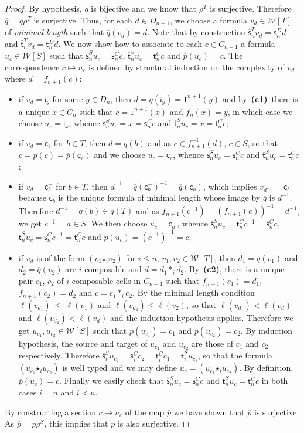 \documentclass[reqno]{amsart}
\theoremstyle{plain}
\theoremstyle{definition}
\theoremstyle{remark}
\newcommand{\source}{\mathsf{s}} %
\newcommand{\target}{\mathsf{t}} %
\newcommand{\unit}[1]{1^{#1}} %
\newcommand{\comp}[1]{\ast_{#1}} %
\newcommand{\sce}[1]{\source_{#1}} %
\newcommand{\tge}[1]{\target_{#1}} %
\newcommand{\inv}[1]{{#1}^{-1}} %
\newcommand{\WW}{\mathcal{W}}
\newcommand{\wtx}[1]{\WW[#1]} %
\newcommand{\formal}[1]{\mathsf{#1}} %
\newcommand{\fcst}[1]{\formal{c}_{#1}} %
\newcommand{\finv}[1]{\formal{c}^{\boldsymbol{-}}_{#1}}%
\newcommand{\fid}[1]{\formal{i}_{#1}} %
\newcommand{\fcomp}[1]{\bm{\star}_{#1}} %
\newcommand{\cans}[1]{\rho^{#1}} %
\newcommand{\fcls}[1]{\widetilde{#1}}%
\newcommand{\scex}[1]{\extend{\source}_{#1}}
\newcommand{\tgex}[1]{\extend{\target}_{#1}}
\newcommand{\lgh}{\ell}%
\newcommand{\extend}[1]{\overline{#1}} %
\newcommand{\cndi}{\textbf{(c1)}} %
\newcommand{\cndii}{\textbf{(c2)}} %
\begin{document}
\begin{proof}
  By hypothesis, $\fcls q$ is bijective and we know that $\cans T$ is
surjective. Therefore $\extend q=\fcls q\cans T$ is surjective.  Thus,
for each $d\in D_{n+1}$, we choose a formula  $v_d\in \wtx T$ of
{\em minimal length} such
that $\extend q(v_d)=d$. Note that by construction $\scex
n^Tv_d=\sce n^D d$ and $\tgex n^Tv_d=\tge n^D d$.
We now show how to associate to each $c\in C_{n+1}$ a formula
$u_c\in\wtx S$ such that $\scex n^S u_c=\sce
n^C c$, $\tgex n^S u_c=\tge n^C c$ and $\extend p(u_c)=c$. The
correspondence $c\mapsto u_c$ is defined by structural induction on
the complexity of $v_d$ where $d=f_{n+1}(c)$:
\begin{itemize}
\item if $v_d=\fid y$ for some $y\in D_n$, then $d=\extend q(\fid
  y)=\unit{n+1}(y)$ and by~\cndi\
  there is a unique $x\in C_n$ such that $c=\unit{n+1}(x)$ and $f_n(x)=y$, in
  which case we choose  $u_c=\fid x$, whence $\scex n^Su_c=x=\sce n^Cc$
  and $\tgex n^Su_c=x=\tge n^Cc$;   
\item if $v_d=\fcst b$ for $b\in T$, then $d=q(b)$ and as  $c\in
  f_{n+1}^{-1}(d)$, $c\in S$, so that $c=p(c)=\extend p(\fcst c)$ and we
  choose $u_c=\fcst c$, whence $\scex n^Su_c=\sce n^Cc$
  and $\tgex n^Su_c=\tge n^Cc$; 
 \item if $v_d=\finv b$ for $b\in T$, then $\inv d=\inv{\extend q(\finv b)}=\extend q(\fcst b)$, which
   implies $v_{\inv d}=\fcst b$ because $\fcst b$ is the unique
   formula of minimal length whose image by $\extend q$ is $\inv
   d$. Therefore $\inv d=q(b)\in q(T)$ and as $f_{n+1}(\inv
   c)=\inv{(f_{n+1}(c))}=\inv d$, we get $\inv c=a\in S$. We then
   choose $u_c=\finv a$, whence
   $\scex n^Su_c=\tge n^C\inv c=\sce n^Cc$,
   $\tgex n^Su_c=\sce n^C\inv c=\tge n^Cc$ and $\extend
   p(u_c)=\inv{(\inv c)}=c$;
 \item if $v_d$ is of the form $(v_1\fcomp i v_2)$ for $i\leq n$,
   $v_1,v_2\in \wtx T$, then $d_1=\extend q(v_1)$ and $d_2=\extend q
   (v_2)$ are $i$-composable and $d=d_1\comp i d_2$. By~\cndii, there is a unique pair $c_1$, $c_2$ of
   $i$-composable cells in $C_{n+1}$ such that $f_{n+1}(c_1)=d_1$,
   $f_{n+1}(c_2)=d_2$ and $c=c_1\comp i c_2$. 
By the minimal length condition $\lgh(v_{d_1})~\leq~\lgh(v_1) $ and $\lgh(v_{d_2})\leq \lgh(v_2)$, so that
   $\lgh(v_{d_1})<\lgh(v_d)$ and $\lgh(v_{d_2})<\lgh(v_d)$ and the
   induction hypothesis applies. Therefore we get
   $u_{c_1},u_{c_2}\in\wtx S$ such that $\extend p(u_{c_1})=c_1$ and
   $\extend p(u_{c_2})=c_2$. By induction hypothesis, the source and
   target of $u_{c_1}$ and $u_{c_2}$ are those of $c_1$ and $c_2$
   respectively. Therefore $\scex i^Su_{c_2}=\sce i^Cc_2=\tge
   i^Cc_1=\tgex i^Su_{c_1}$, so that the formula $(u_{c_1}\fcomp i
   u_{c_2})$ is well typed and we may define $u_c=(u_{c_1}\fcomp i
   u_{c_2})$. By definition, $\extend p(u_c)=c$. Finally we easily check
   that $\scex n^Su_c=\sce n^Cc$ and $\tgex n^Su_c=\tge n^C c$ in both
   cases $i=n$ and $i<n$. 
 \end{itemize}
 By constructing a section $c\mapsto u_c$ of the map $\extend p$ we
 have shown that $\extend p$ is surjective. As $\extend p=\fcls p\cans
 S$, this implies that $\fcls p$ is also surjective.
\end{proof}
\end{document}
